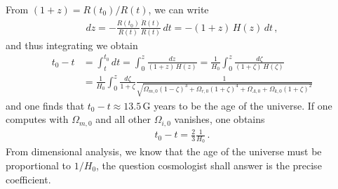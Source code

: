\documentclass[11pt, onesided]{book}
\theoremstyle{break}
\theoremstyle{break}
\begin{document}
From $(1+z) = R(t_0)/R(t)$, we can write
\begin{align*}
dz = -\frac{R(t_0)}{R(t)} \frac{\dot{R}(t)}{R(t)} \, dt= -(1+z) \, H(z) \, dt\,,
\end{align*}
and thus integrating we obtain
\begin{align*}
t_0-t
&= \int_{t}^{t_0}dt = \int_0^z \frac{dz}{(1+z) \, H(z)} = \frac{1}{H_0}\int_0^z \frac{d\zeta}{(1+\zeta) \, H(\zeta)}\\
&= \frac{1}{H_0}\int_0^z \frac{d\zeta}{1+\zeta} \frac{1}{\sqrt{\Omega_{m,0}(1-\zeta)^3 + \Omega_{r,0}(1+\zeta)^4 + \Omega_{\Lambda,0} + \Omega_{k,0}(1+\zeta)^2}}
\end{align*}
and one finds that $t_0-t \approx 13.5\,$G years to be the age of the universe. If one computes with $\Omega_{m,0}$ and all other $\Omega_{i,0}$ vanishes, one obtains
\begin{align*}
t_0-t = \frac{2}{3}\frac{1}{H_0}\,.
\end{align*}
From dimensional analysis, we know that the age of the universe must be proportional to $1/H_0$, the question cosmologist shall answer is the precise coefficient. 
\end{document}
